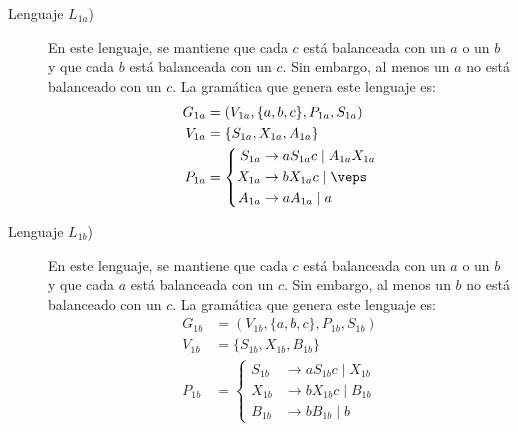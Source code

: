 \begin{ejercicio}
\begin{enumerate}
\begin{description}
            \item[Lenguaje $L_{1a}$)] En este lenguaje, se mantiene que cada $c$ está balanceada con un $a$ o un $b$ y que cada $b$ está balanceada con un $c$. Sin embargo, al menos un $a$ no está balanceado con un $c$. La gramática que genera este lenguaje es:
            \begin{equation*}
                \begin{aligned}
                    G_{1a} &= (V_{1a},\{a,b,c\},P_{1a},S_{1a}) \\
                    V_{1a} &= \{ S_{1a}, X_{1a}, A_{1a} \} \\
                    P_{1a} &= \left\{
                        \begin{aligned}
                            S_{1a} &\rightarrow aS_{1a}c \mid A_{1a}X_{1a}\\
                            X_{1a} &\rightarrow bX_{1a}c \mid \veps\\
                            A_{1a} &\rightarrow aA_{1a} \mid a
                        \end{aligned}
                    \right.
                \end{aligned}
            \end{equation*}

            \item[Lenguaje $L_{1b}$)] En este lenguaje, se mantiene que cada $c$ está balanceada con un $a$ o un $b$ y que cada $a$ está balanceada con un $c$. Sin embargo, al menos un $b$ no está balanceado con un $c$. La gramática que genera este lenguaje es:
            \begin{equation*}
                \begin{aligned}
                    G_{1b} &= (V_{1b},\{a,b,c\},P_{1b},S_{1b}) \\
                    V_{1b} &= \{ S_{1b}, X_{1b}, B_{1b}\} \\
                    P_{1b} &= \left\{
                        \begin{aligned}
                            S_{1b} &\rightarrow aS_{1b}c \mid X_{1b}\\
                            X_{1b} &\rightarrow bX_{1b}c \mid B_{1b}\\
                            B_{1b} &\rightarrow bB_{1b} \mid b
                        \end{aligned}
                    \right.
                \end{aligned}
            \end{equation*}


\end{description}
\end{enumerate}
\end{ejercicio}
